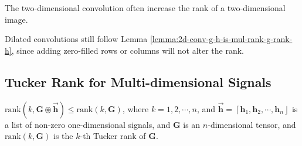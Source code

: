\documentclass[twoside,11pt]{article}
\def\oconv{\circledast}
\def\rank{\text{rank}}
\def\tvar#1{\mathbf{#1}} %
\def\vsymb#1{\vec{\mathbf{#1}}}
\def\lcerfl#1{\left\lceil{#1}\right\rfloor}
\begin{document}
\begin{remark}
  
    The two-dimensional convolution often increase the rank of a two-dimensional image.
  
\end{remark}

\begin{remark}
  Dilated convolutions \citep{Yu2016} still follow Lemma \ref{lemma:2d-conv-g-h-is-mul-rank-g-rank-h}, since adding zero-filled rows or columns will not alter the rank.
  \label{remark:dilated-convolution-still-works}
\end{remark}

\subsection{Tucker Rank for Multi-dimensional Signals}
\label{subsec:tucker-rank-for-multi-dimensional-signals}

\begin{lemma}
  \(\rank(k, \tvar{G} \oconv \vsymb{h}) \le \rank(k, \tvar{G})\), where \(k = 1, 2, \cdots, n\), and \(\vsymb{h} = \lcerfl{\tvar{h}_1, \tvar{h}_2, \cdots, \tvar{h}_n}\) is a list of non-zero one-dimensional signals, and \(\tvar{G}\) is an \(n\)-dimensional tensor, and \(\rank(k, \tvar{G})\) is the \(k\)-th Tucker rank of \(\tvar{G}\).
  \label{lemma:rank-oconv-g-hhh-is-tucker-rank}
\end{lemma}
\end{document}
